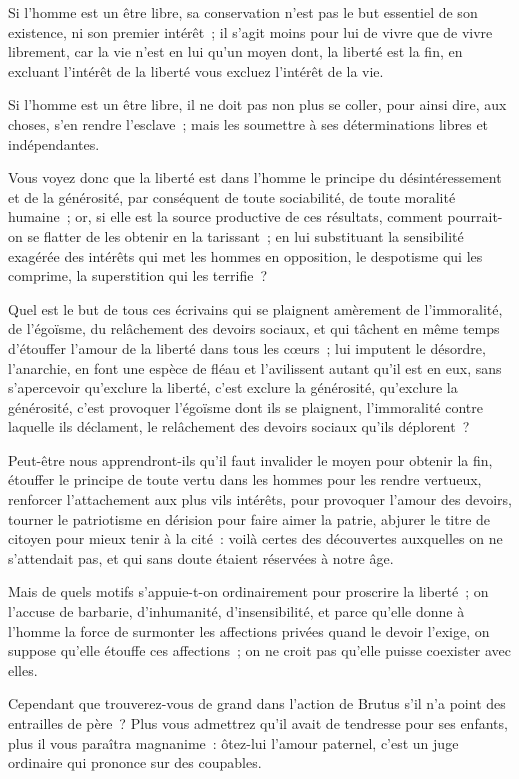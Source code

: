 \documentclass[french,twoside]{book} %
\begin{document}
Si l’homme est un être libre, sa conservation n’est pas le but essentiel de son existence, ni son premier intérêt ; il s’agit moins pour lui de vivre que de vivre librement, car la vie n’est en lui qu’un moyen dont, la liberté est la fin, en excluant l’intérêt de la liberté vous excluez l’intérêt de la vie.\par
Si l’homme est un être libre, il ne doit pas non plus se coller, pour ainsi dire, aux choses, s’en rendre l’esclave ; mais les soumettre à ses déterminations libres et indépendantes.\par
Vous voyez donc que la liberté est dans l’homme le principe du désintéressement et de la générosité, par conséquent de toute sociabilité, de toute moralité humaine ; or, si elle est la source productive de ces résultats, comment pourrait-on se flatter de les obtenir en la tarissant ; en lui substituant la sensibilité exagérée des intérêts qui met les hommes en opposition, le despotisme qui les comprime, la superstition qui les terrifie ?\par
Quel est le but de tous ces écrivains qui se plaignent amèrement de l’immoralité, de l’égoïsme, du relâchement des devoirs sociaux, et qui tâchent en même temps d’étouffer l’amour de la liberté dans tous les cœurs ; lui imputent le désordre, l’anarchie, en font une espèce de fléau et l’avilissent autant qu’il est en eux, sans s’apercevoir qu’exclure la liberté, c’est exclure la générosité, qu’exclure la générosité, c’est provoquer l’égoïsme dont ils se plaignent, l’immoralité contre laquelle ils déclament, le relâchement des devoirs sociaux qu’ils déplorent ?\par
Peut-être nous apprendront-ils qu’il faut invalider le moyen pour obtenir la fin, étouffer le principe de toute vertu dans les hommes pour les rendre vertueux, renforcer l’attachement aux plus vils intérêts, pour provoquer l’amour des devoirs, tourner le patriotisme en dérision pour faire aimer la patrie, abjurer le titre de citoyen pour mieux tenir à la cité : voilà certes des découvertes auxquelles on ne s’attendait pas, et qui sans doute étaient réservées à notre âge.\par
Mais de quels motifs s’appuie-t-on ordinairement pour proscrire la liberté ; on l’accuse de barbarie, d’inhumanité, d’insensibilité, et parce qu’elle donne à l’homme la force de surmonter les affections privées quand le devoir l’exige, on suppose qu’elle étouffe ces affections ; on ne croit pas qu’elle puisse coexister avec elles.\par
Cependant que trouverez-vous de grand dans l’action de Brutus s’il n’a point des entrailles de père ? Plus vous admettrez qu’il avait de tendresse pour ses enfants, plus il vous paraîtra magnanime : ôtez-lui l’amour paternel, c’est un juge ordinaire qui prononce sur des coupables.\par
\end{document}
